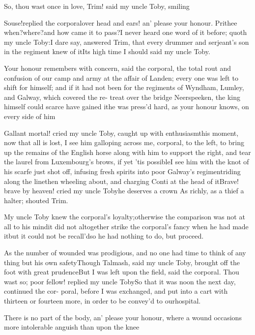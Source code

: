 \documentclass{article}
\begin{document}
So, thou wast once in love, Trim! said my uncle Toby, smiling\tsh

Souse!\@ replied the corporal\tsk over head and ears! an’ please your honour. Prithee
when?\@ where?\tsk and how came it to pass?\tsk I never heard one word of it before; quoth
my uncle Toby:\tsh I dare say, answered Trim, that every drummer and
serjeant’s son in the regiment knew of it\tsh Its high time I should \tsh said my
uncle Toby.

Your honour remembers with concern, said the corporal, the total rout and confusion
of our camp and army at the affair of Landen; every one was left to shift for
himself; and if it had not been for the regiments of Wyndham, Lumley, and Galway,
which covered the re- treat over the bridge Neerspeeken, the king himself could
scarce have gained it\tsh he was press’d hard, as your honour knows, on every side
of him\tsh

Gallant mortal! cried my uncle Toby, caught up with
enthusiasm\tsk this moment, now that all is lost, I see him
galloping across me, corporal, to the left, to bring up the remains
of the English horse along with him to support the right,
and tear the laurel from Luxembourg’s
brows, if yet ’tis possible\tsh I see him with the
knot of his scarfe just shot off, infusing fresh spirits into poor
Galway’s regiment\tsk riding along the
line\tsk then wheeling about, and charging Conti at the
head of it\tsh Brave! brave by heaven! cried my uncle
Toby\tsk he deserves a crown \tsh As richly, as a
thief a halter; shouted Trim.

My uncle Toby knew the corporal’s
loyalty;\tsk otherwise the comparison was not at all to his
mind\tsh it did not altogether strike the corporal’s
fancy when he had made it\tsh but it could not be
recall’d\tsh so he had nothing to do, but
proceed.

As the number of wounded was prodigious, and no one had time to
think of any thing but his own safety\tsk Though Talmash,
said my uncle Toby, brought off the foot with great
prudence\tsh\break But I was left upon the field, said the
corporal. Thou wast so; poor fellow! replied my uncle
Toby\tsk So that it was noon the next day, continued the
cor- poral, before I was exchanged, and put into a cart
with thirteen or fourteen more, in order to be convey’d to
our\break hospital.

There is no part of the body, an’ please your honour,
where a wound occasions more intolerable anguish than upon the
knee\tsh
\end{document}
